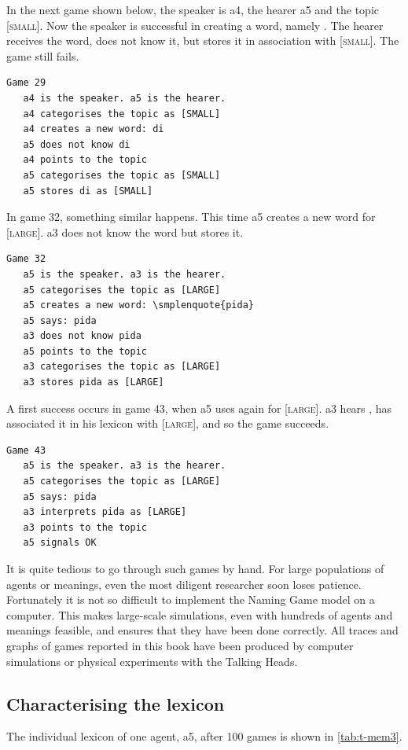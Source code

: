 In the next game shown below, the speaker is 
{\bfshape a4}, the hearer {\bfshape a5} and the topic
{}[\textsc{small}]. Now the speaker is successful in creating a word, namely 
. The hearer receives the word, does not know it,
but stores it in association with [\textsc{small}]. The game still fails. 
\begin{verbatim}
Game 29
   a4 is the speaker. a5 is the hearer. 
   a4 categorises the topic as [SMALL]
   a4 creates a new word: di
   a5 does not know di
   a4 points to the topic
   a5 categorises the topic as [SMALL]
   a5 stores di as [SMALL]
\end{verbatim}
In game 32, something similar happens. This time {\bfshape a5} creates
a new word  for [\textsc{large}]. {\bfshape a3} does not know 
the word but stores it. 
\begin{verbatim}
Game 32
   a5 is the speaker. a3 is the hearer. 
   a5 categorises the topic as [LARGE]
   a5 creates a new word: \smplenquote{pida}
   a5 says: pida
   a3 does not know pida
   a5 points to the topic
   a3 categorises the topic as [LARGE]
   a3 stores pida as [LARGE]
\end{verbatim}
A first success occurs in game 43, when {\bfshape a5} uses again 
 for [\textsc{large}]. {\bfshape a3} hears , has associated it 
in his lexicon with [\textsc{large}], and so the game succeeds. 
\begin{verbatim}
Game 43
   a5 is the speaker. a3 is the hearer. 
   a5 categorises the topic as [LARGE]
   a5 says: pida
   a3 interprets pida as [LARGE]
   a3 points to the topic 
   a5 signals OK
\end{verbatim}
It is quite tedious to go through such games by hand. 
For large populations of agents or meanings, even the 
most diligent researcher soon loses patience. Fortunately 
it is not so difficult to implement the Naming Game model on 
a computer. This makes large-scale simulations, even with 
hundreds of agents and meanings feasible, and ensures
that they have been done correctly.
All traces and graphs of games reported in this book
have been produced by computer simulations or physical 
experiments with the Talking Heads. 

\subsection{Characterising the lexicon}

The individual lexicon of one
agent, {\bfshape a5}, after 100 games is shown in \ref{tab:t-mem3}. 

